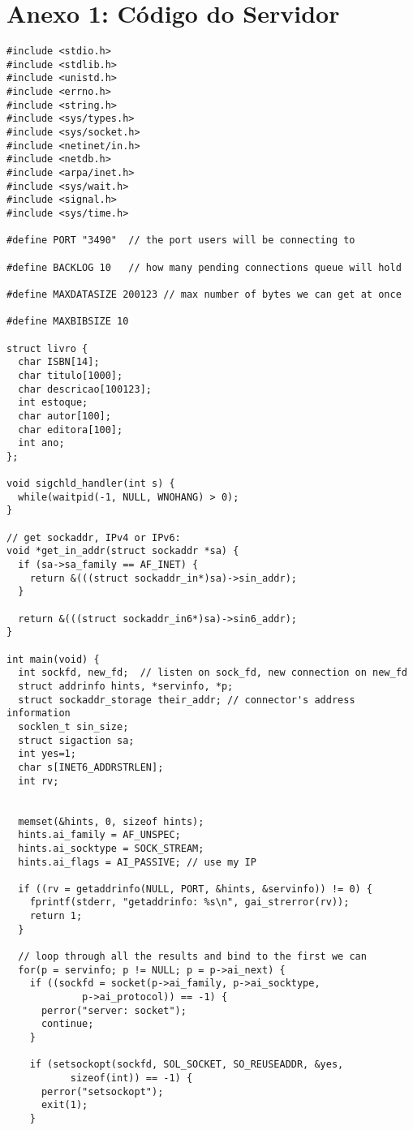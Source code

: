 \documentclass[11pt, brazil]{article} %
\begin{document}
\section*{Anexo 1: Código do Servidor}

\begin{verbatim}
#include <stdio.h>
#include <stdlib.h>
#include <unistd.h>
#include <errno.h>
#include <string.h>
#include <sys/types.h>
#include <sys/socket.h>
#include <netinet/in.h>
#include <netdb.h>
#include <arpa/inet.h>
#include <sys/wait.h>
#include <signal.h>
#include <sys/time.h>

#define PORT "3490"  // the port users will be connecting to

#define BACKLOG 10	 // how many pending connections queue will hold

#define MAXDATASIZE 200123 // max number of bytes we can get at once

#define MAXBIBSIZE 10

struct livro {
  char ISBN[14];
  char titulo[1000];
  char descricao[100123];
  int estoque;
  char autor[100];
  char editora[100];
  int ano;
};

void sigchld_handler(int s) {
  while(waitpid(-1, NULL, WNOHANG) > 0);
}

// get sockaddr, IPv4 or IPv6:
void *get_in_addr(struct sockaddr *sa) {
  if (sa->sa_family == AF_INET) {
    return &(((struct sockaddr_in*)sa)->sin_addr);
  }

  return &(((struct sockaddr_in6*)sa)->sin6_addr);
}

int main(void) {
  int sockfd, new_fd;  // listen on sock_fd, new connection on new_fd
  struct addrinfo hints, *servinfo, *p;
  struct sockaddr_storage their_addr; // connector's address information
  socklen_t sin_size;
  struct sigaction sa;
  int yes=1;
  char s[INET6_ADDRSTRLEN];
  int rv;


  memset(&hints, 0, sizeof hints);
  hints.ai_family = AF_UNSPEC;
  hints.ai_socktype = SOCK_STREAM;
  hints.ai_flags = AI_PASSIVE; // use my IP

  if ((rv = getaddrinfo(NULL, PORT, &hints, &servinfo)) != 0) {
    fprintf(stderr, "getaddrinfo: %s\n", gai_strerror(rv));
    return 1;
  }

  // loop through all the results and bind to the first we can
  for(p = servinfo; p != NULL; p = p->ai_next) {
    if ((sockfd = socket(p->ai_family, p->ai_socktype,
			 p->ai_protocol)) == -1) {
      perror("server: socket");
      continue;
    }

    if (setsockopt(sockfd, SOL_SOCKET, SO_REUSEADDR, &yes,
		   sizeof(int)) == -1) {
      perror("setsockopt");
      exit(1);
    }


\end{verbatim}
\end{document}
